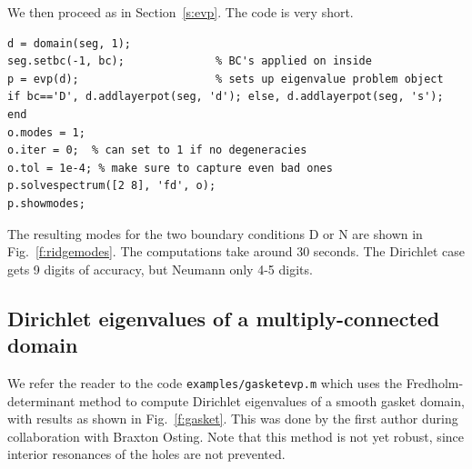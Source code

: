 We then proceed as in Section~\ref{s:evp}. The code is very short.
\begin{verbatim}
d = domain(seg, 1);
seg.setbc(-1, bc);              % BC's applied on inside
p = evp(d);                     % sets up eigenvalue problem object
if bc=='D', d.addlayerpot(seg, 'd'); else, d.addlayerpot(seg, 's'); end
o.modes = 1;
o.iter = 0;  % can set to 1 if no degeneracies
o.tol = 1e-4; % make sure to capture even bad ones
p.solvespectrum([2 8], 'fd', o);
p.showmodes;
\end{verbatim}
The resulting modes for the two boundary conditions D or N are shown
in Fig.~\ref{f:ridgemodes}.
The computations take around 30 seconds.
The Dirichlet case gets 9 digits of accuracy, but Neumann only 4-5 digits.





\bfi %
\efi

\subsection{Dirichlet eigenvalues of a multiply-connected domain}
\label{s:gasket}

We refer the reader to the code {\tt examples/gasketevp.m} which uses
the Fredholm-determinant method to compute Dirichlet eigenvalues
of a smooth gasket domain, with results as shown in Fig.~\ref{f:gasket}.
This was done by the first author during collaboration with Braxton Osting.
Note that this method is not yet robust, since interior resonances
of the holes are not prevented.



